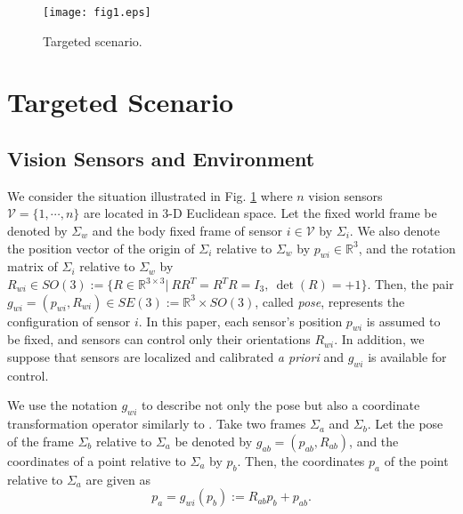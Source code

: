 \documentclass[conference,letterpaper]{ieeeconf}
\newcommand{\V}{{\mathcal V}}
\newcommand{\R}{{\mathbb R}}
\newcommand{\ewi}{R_{wi}}
\begin{document}
\begin{figure}[t]
\begin{center}
\texttt{[image: fig1.eps]}
\caption{Targeted scenario.}
\label{fig:scenario}
\end{center}
\end{figure}







\section{Targeted Scenario}


\subsection{Vision Sensors and Environment}





We consider the situation illustrated in Fig. \ref{fig:scenario} where
$n$ vision sensors $\V = \{1,\cdots, n\}$ are located in 3-D Euclidean space.
Let the fixed world frame be denoted by 
$\Sigma_w$ and the body fixed frame of sensor $i \in \V$
by $\Sigma_i$.
We also denote the position vector of the origin of $\Sigma_i$
relative to $\Sigma_w$ by $p_{wi} \in \R^3$,
and the rotation matrix of $\Sigma_i$ relative to $\Sigma_w$
by $\ewi\in SO(3) := \{R \in \R^{3\times 3}|\ RR^T = R^TR = I_3,\
\det(R) = +1\}$.
Then, the pair $g_{wi} = (p_{wi},\ewi)\in SE(3) := \R^3 \times SO(3)$,
called {\it pose}, represents
the configuration of sensor $i$.
In this paper, each sensor's position $p_{wi}$ is assumed to be fixed,
and sensors can control only their orientations $\ewi$.
In addition, we suppose that sensors are localized and calibrated {\it a priori}
and $g_{wi}$ is available for control.






We use the notation $g_{wi}$ to describe not only the pose
but also a coordinate transformation operator similarly to \cite{MLS_BK}.
Take two frames $\Sigma_a$ and $\Sigma_b$. 
Let the pose of the frame $\Sigma_b$ relative to $\Sigma_a$ be denoted by $g_{ab} = (p_{ab},R_{ab})$,
and the coordinates of a point relative to $\Sigma_a$ by $p_b$.
Then, the coordinates $p_a$ of the point relative to $\Sigma_a$ are 
given as
\[
p_a = g_{wi}(p_b) :=
R_{ab}p_b + p_{ab}.
\]
\end{document}
